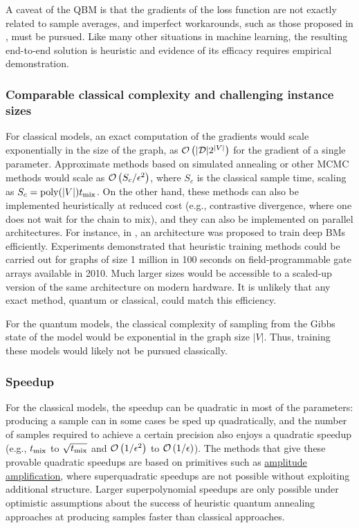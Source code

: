 \begin{refsection}
A caveat of the QBM is that the gradients of the loss function are not exactly related to sample averages, and imperfect workarounds, such as those proposed in \cite{amin2016QBoltzMachine}, must be pursued. Like many other situations in machine learning, the resulting end-to-end solution is heuristic and evidence of its efficacy requires empirical demonstration. 

\subsubsection*{Comparable classical complexity and challenging instance sizes}

For classical models, an exact computation of the gradients would scale exponentially in the size of the graph, as $\mathcal{O}\left( |\mathcal{D}|2^{|V|} \right)$ for the gradient of a single parameter. Approximate methods based on simulated annealing or other MCMC methods would scale as $\mathcal{O}\left( S_c/\epsilon^2 \right)$, where $S_c$ is the classical sample time, scaling as $S_c = \mathrm{poly}(|V|)t_{\rm mix}$. On the other hand, these methods can also be implemented heuristically at reduced cost (e.g., contrastive divergence, where one does not wait for the chain to mix), and they can also be implemented on parallel architectures. For instance, in \cite{kim2010largeScaleRBM}, an architecture was proposed to train deep BMs efficiently. Experiments demonstrated that heuristic training methods could be carried out for graphs of size 1 million in 100 seconds on field-programmable gate arrays available in 2010. Much larger sizes would be accessible to a scaled-up version of the same architecture on modern hardware. It is unlikely that any exact method, quantum or classical, could match this efficiency. 

For the quantum models, the classical complexity of sampling from the Gibbs state of the model would be exponential in the graph size $|V|$. Thus, training these models would likely not be pursued classically. 


\subsubsection*{Speedup}

For the classical models, the speedup can be quadratic in most of the parameters: producing a sample can in some cases be sped up quadratically, and the number of samples required to achieve a certain precision also enjoys a quadratic speedup (e.g., $t_{\rm mix}$ to $\sqrt{t_{\rm mix}}$  and $\mathcal{O}\left( 1/\epsilon^2 \right)$ to $\mathcal{O}\left( 1/\epsilon \right)$). The methods that give these provable quadratic speedups are based on primitives such as \hyperref[prim:AmpAmp]{amplitude amplification}, where superquadratic speedups are not possible without exploiting additional structure. Larger superpolynomial speedups are only possible under optimistic assumptions about the success of heuristic quantum annealing approaches at producing samples faster than classical approaches. 


\end{refsection}
